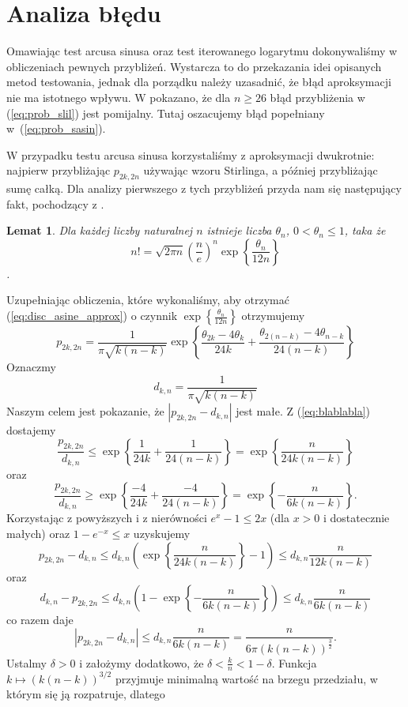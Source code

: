 \documentclass[a4paper,11pt,twoside]{book}
\newtheorem{lemat}[twier]{Lemat}
\theoremstyle{definition}
\begin{document}
\section{Analiza błędu}
Omawiając test arcusa sinusa oraz test iterowanego logarytmu dokonywaliśmy w obliczeniach pewnych przybliżeń. Wystarcza to do przekazania idei opisanych metod testowania, jednak dla porządku należy uzasadnić, że błąd aproksymacji nie ma istotnego wpływu. W \cite{wang-nic} pokazano, że dla $n \geq 26$ błąd przybliżenia w (\ref{eq:prob_slil}) jest pomijalny. Tutaj oszacujemy błąd popełniany w~(\ref{eq:prob_sasin}).

W przypadku testu arcusa sinusa korzystaliśmy z aproksymacji dwukrotnie: najpierw przybliżając $p_{2k,2n}$ używając wzoru Stirlinga, a później przybliżając sumę całką. Dla analizy pierwszego z tych przybliżeń przyda nam się następujący fakt, pochodzący z \cite{leja}.
\begin{lemat}
 Dla każdej liczby naturalnej $n$ istnieje liczba $\theta_n$, $0 < \theta_n \leq 1$, taka że
 \[ n! = \sqrt{2\pi n} \left( \frac{n}{e} \right)^n \exp\left\{\frac{\theta_n}{12n}\right\} \].
\end{lemat}
Uzupełniając obliczenia, które wykonaliśmy, aby otrzymać (\ref{eq:disc_asine_approx}) o czynnik $\exp\left\{\frac{\theta_n}{12n}\right\}$ otrzymujemy
\begin{equation}
 \label{eq:blablabla}
 p_{2k,2n} = \frac{1}{\pi \sqrt{k(n-k)}} \exp\left\{ \frac{\theta_{2k} - 4\theta_k}{24k} + \frac{\theta_{2(n-k)} - 4\theta_{n-k}}{24(n-k)} \right\}
\end{equation}
Oznaczmy
\[ d_{k,n} = \frac{1}{\pi \sqrt{k(n-k)}} \]
Naszym celem jest pokazanie, że $|p_{2k,2n} - d_{k,n}|$ jest małe. Z (\ref{eq:blablabla}) dostajemy
\[ \frac{p_{2k,2n}}{d_{k,n}} \leq \exp\left\{ \frac{1}{24k} + \frac{1}{24(n-k)} \right\} = \exp\left\{ \frac{n}{24k(n-k)} \right\} \]
oraz
\[ \frac{p_{2k,2n}}{d_{k,n}} \geq \exp\left\{ \frac{-4}{24k} + \frac{-4}{24(n-k)} \right\} = \exp\left\{ -\frac{n}{6k(n-k)} \right\}. \]
Korzystając z powyższych i z nierówności $e^x - 1 \leq 2x$ (dla $x > 0$ i dostatecznie małych) oraz $1 - e^{-x} \leq x$ uzyskujemy
\[ p_{2k,2n} - d_{k,n} \leq d_{k,n} \left(\exp\left\{ \frac{n}{24k(n-k)} \right\} - 1\right) \leq d_{k,n}\frac{n}{12k(n-k)} \]
oraz 
\[ d_{k,n} - p_{2k,2n} \leq d_{k,n} \left( 1 -\exp\left\{ -\frac{n}{6k(n-k)} \right\} \right) \leq d_{k,n}\frac{n}{6k(n-k)} \]
co razem daje 
\[ |p_{2k,2n} - d_{k,n}| \leq  d_{k,n}\frac{n}{6k(n-k)} = \frac{n}{6\pi\left( k(n-k) \right)^{\frac{3}{2}}}. \]
Ustalmy $\delta > 0$ i założymy dodatkowo, że $\delta < \frac{k}{n} < 1 - \delta$. Funkcja $k \mapsto \left( k(n-k) \right)^{3/2}$ przyjmuje minimalną wartość na brzegu przedziału, w którym się ją rozpatruje, dlatego
\end{document}
